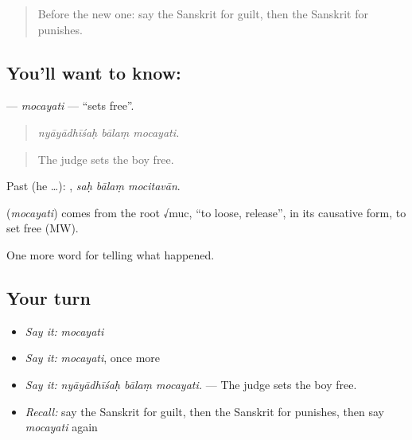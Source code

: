 \label{lesson:SA-C293-mocayati}



\begin{quote}
Before the new one: say the Sanskrit for guilt, then the Sanskrit for punishes.
\end{quote}

\subsection*{You'll want to know: }
\textbf{} — \emph{mocayati} — \textquotedblleft{}sets free\textquotedblright{}.

\begin{quote}
  
\end{quote}

\begin{quote}
\emph{nyāyādhīśaḥ bālaṃ mocayati.}
\end{quote}

\begin{quote}
The judge sets the boy free.
\end{quote}

Past (he …):   , \emph{saḥ bālaṃ mocitavān}.

\begin{cousinweb}
\textbf{} (\emph{mocayati}) comes from the root √muc, \textquotedblleft{}to loose, release\textquotedblright{}, in its causative form, to set free (MW).
\end{cousinweb}

\begin{grammarlens}[title={What you've built}]
One more word for telling what happened.
\end{grammarlens}

\subsection*{Your turn}
\begin{itemize}
\raggedright
  \item \emph{Say it:} \emph{mocayati}
  \item \emph{Say it:} \emph{mocayati}, once more
  \item \emph{Say it:} \emph{nyāyādhīśaḥ bālaṃ mocayati.} — The judge sets the boy free.
  \item \emph{Recall:} say the Sanskrit for guilt, then the Sanskrit for punishes, then say \emph{mocayati} again
\end{itemize}

